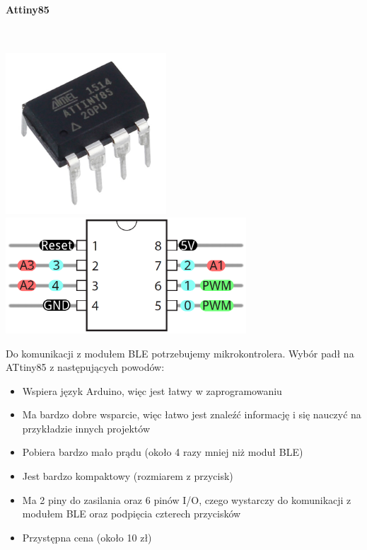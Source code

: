 \documentclass[eng,printmode]{mgr}
\begin{document}
\pagebreak
\paragraph{Attiny85}\mbox{} \\
\begin{center}
\includegraphics[width=6cm]{attiny}
\linebreak
\includegraphics[width=9cm]{attiny-pinout}
\end{center}

Do komunikacji z modułem BLE potrzebujemy mikrokontrolera. Wybór padł na ATtiny85 z następujących powodów:

\begin{itemize}
\item Wspiera język Arduino, więc jest łatwy w zaprogramowaniu
\item Ma bardzo dobre wsparcie, więc łatwo jest znaleźć informację i się nauczyć na przykładzie innych projektów
\item Pobiera bardzo mało prądu (około 4 razy mniej niż moduł BLE)
\item Jest bardzo kompaktowy (rozmiarem z przycisk)
\item Ma 2 piny do zasilania oraz 6 pinów I/O, czego wystarczy do komunikacji z modułem BLE oraz podpięcia czterech przycisków
\item Przystępna cena (około 10 zł)
\end{itemize}
\end{document}
